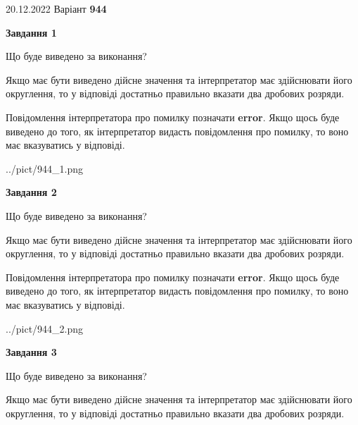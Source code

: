 \documentclass[12pt, ukrainian]{article}
\begin{document}
{20.12.2022 Варіант \No \textbf { 944 }\par}
{
\begin {Large}

{\begin {center}\textbf{Завдання 1}\end {center}}\par
Що буде виведено за виконання? \par

Якщо має бути виведено дійсне значення та інтерпретатор має здійснювати його округлення, 
то у відповіді достатньо правильно вказати два дробових розряди.

Повідомлення інтерпретатора про помилку позначати \textbf{error}.
Якщо щось буде виведено до того, як інтерпретатор видасть повідомлення про помилку, 
то воно має вказуватись у відповіді. \par

\begin{center}
	{../pict/944_1.png}
\end{center}
\newpage

{\begin {center}\textbf{Завдання 2}\end {center}}\par
Що буде виведено за виконання? \par

Якщо має бути виведено дійсне значення та інтерпретатор має здійснювати його округлення, 
то у відповіді достатньо правильно вказати два дробових розряди.

Повідомлення інтерпретатора про помилку позначати \textbf{error}.
Якщо щось буде виведено до того, як інтерпретатор видасть повідомлення про помилку, 
то воно має вказуватись у відповіді. \par

\begin{center}
	{../pict/944_2.png}
\end{center}
\newpage

{\begin {center}\textbf{Завдання 3}\end {center}}\par
Що буде виведено за виконання? \par

Якщо має бути виведено дійсне значення та інтерпретатор має здійснювати його округлення, 
то у відповіді достатньо правильно вказати два дробових розряди.


\end{Large}}
\end{document}
